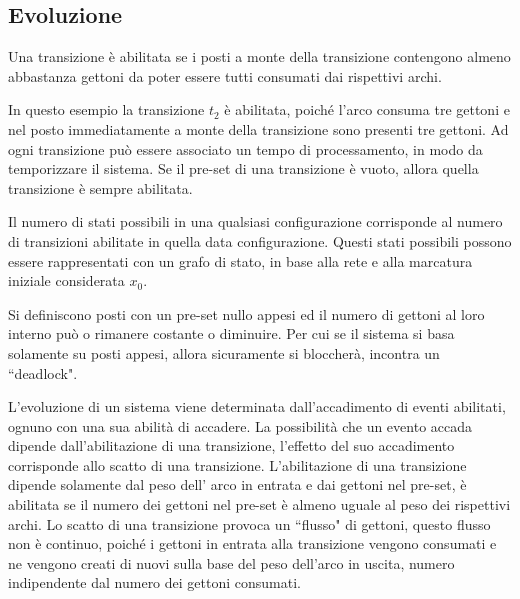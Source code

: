 \documentclass{article}
\numberwithin{equation}{subsection}
\begin{document}
\subsection{Evoluzione}

Una transizione è abilitata se i posti a monte della transizione contengono almeno abbastanza gettoni da poter essere tutti consumati dai rispettivi archi. 

\begin{center}
\end{center}

In questo esempio la transizione $t_2$ è abilitata, poiché l'arco consuma tre gettoni e nel posto immediatamente a monte della transizione sono presenti tre gettoni. 
Ad ogni transizione può essere associato un tempo di processamento, in modo da temporizzare il sistema. Se il pre-set di una transizione è vuoto, allora quella transizione 
è sempre abilitata. 

Il numero di stati possibili in una qualsiasi configurazione corrisponde al numero di transizioni abilitate in quella data configurazione. Questi stati possibili possono 
essere rappresentati con un grafo di stato, in base alla rete e alla marcatura iniziale considerata $x_0$. 

Si definiscono posti con un pre-set nullo appesi ed il numero di gettoni al loro interno può o rimanere costante o diminuire. Per cui se il sistema si basa solamente su posti 
appesi, allora sicuramente si bloccherà, incontra un ``deadlock". 


L'evoluzione di un sistema viene determinata dall'accadimento di eventi abilitati, ognuno con una sua abilità di accadere. La possibilità che un evento accada dipende dall'abilitazione di una transizione, l'effetto del suo accadimento corrisponde allo scatto di una transizione. L'abilitazione di una transizione dipende solamente dal peso dell'
arco in entrata e dai gettoni nel pre-set, è abilitata se il numero dei gettoni nel pre-set è almeno uguale al peso dei rispettivi archi. 
Lo scatto di una transizione provoca un ``flusso" di gettoni, questo flusso non è continuo, poiché i gettoni in entrata alla transizione vengono consumati e ne vengono creati 
di nuovi sulla base del peso dell'arco in uscita, numero indipendente dal numero dei gettoni consumati. 
\end{document}
